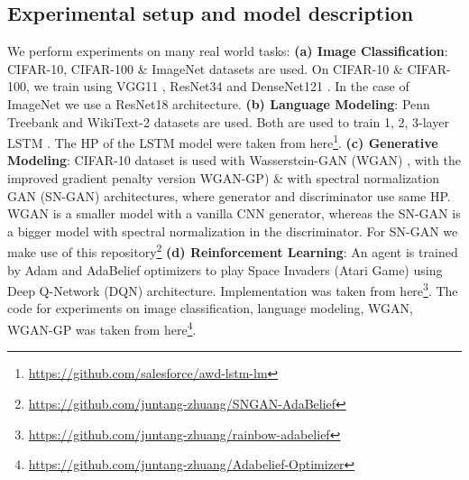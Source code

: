 \subsection{Experimental setup and model description}
We perform experiments on many real world tasks: \textbf{(a) Image Classification}: CIFAR-10, CIFAR-100 \& ImageNet datasets are used. On  CIFAR-10 \& CIFAR-100, we train using VGG11 \cite{VGG}, ResNet34 \cite{Resnet} and DenseNet121 \cite{Densenet} . In the case of ImageNet we use a ResNet18 architecture.  \textbf{(b) Language Modeling}: Penn Treebank \cite{PTB} and WikiText-2 \cite{WikiText_2} datasets are used. Both are used to train 1, 2, 3-layer LSTM \cite{LSTM}. The HP of the LSTM model were taken from here\footnote{\href{https://github.com/salesforce/awd-lstm-lm}{https://github.com/salesforce/awd-lstm-lm}}. \textbf{(c) Generative Modeling}: CIFAR-10 dataset is used with Wasserstein-GAN (WGAN) \cite{WGAN}, with the improved gradient penalty version WGAN-GP) \cite{WGAN-GP} \& with spectral normalization GAN (SN-GAN) \cite{SN-GAN} architectures, where generator and discriminator use same HP. WGAN is a smaller model with a vanilla CNN generator, whereas the SN-GAN is a bigger model with spectral normalization in the discriminator. For SN-GAN we make use of this repository\footnote{\href{https://github.com/juntang-zhuang/SNGAN-AdaBelief}{https://github.com/juntang-zhuang/SNGAN-AdaBelief}} \textbf{(d) Reinforcement Learning}: An agent is trained by Adam and AdaBelief optimizers to play Space Invaders (Atari Game) using Deep Q-Network (DQN) \cite{DQN_RL} architecture. Implementation was taken from here\footnote{\label{fnote:juntang_RL_repo}\href{https://github.com/juntang-zhuang/rainbow-adabelief}{https://github.com/juntang-zhuang/rainbow-adabelief}}. The code for experiments on image classification, language modeling, WGAN, WGAN-GP was taken from here\footnote{\label{fnote:juntang_repo}\href{https://github.com/juntang-zhuang/Adabelief-Optimizer}{https://github.com/juntang-zhuang/Adabelief-Optimizer}}.
	
    




